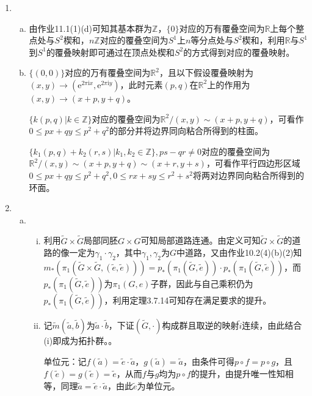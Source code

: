 \documentclass[a4paper,UTF8,fontset=windows]{ctexart}
\begin{document}
\begin{enumerate}[(1)]
    \item
    \begin{enumerate}[(a)]
    \item
    由作业11.1(1)(d)可知其基本群为$\mathbb{Z}$，$\{0\}$对应的万有覆叠空间为$\mathbb{R}$上每个整点处与$S^2$楔和，$n\mathbb{Z}$对应的覆叠空间为$S^1$上$n$等分点处与$S^2$楔和，利用$\mathbb{R}$与$S^1$到$S^1$的覆叠映射即可通过在顶点处楔和$S^2$的方式得到对应的覆叠映射。
    
    \item
    $\{(0,0)\}$对应的万有覆叠空间为$\mathbb{R}^2$，且以下假设覆叠映射为$(x,y)\to(\mathrm{e}^{2\pi\mathrm{i}x},\mathrm{e}^{2\pi\mathrm{i}y})$，此时元素$(p,q)$在$\mathbb{R}^2$上的作用为$(x,y)\to(x+p,y+q)$。
    
    $\{k(p,q)|k\in\mathbb{Z}\}$对应的覆叠空间为$\mathbb{R}^2/(x,y)\sim(x+p,y+q)$，可看作$0\le px+qy\le p^2+q^2$的部分并将边界同向粘合所得到的柱面。
    
    $\{k_1(p,q)+k_2(r,s)|k_1,k_2\in\mathbb{Z}\},ps-qr\ne0$对应的覆叠空间为$\mathbb{R}^2/(x,y)\sim(x+p,y+q)\sim(x+r,y+s)$，可看作平行四边形区域$0\le px+qy\le p^2+q^2,0\le rx+sy\le r^2+s^2$将两对边界同向粘合所得到的环面。
    \end{enumerate}
    
    \item
    \begin{enumerate}[(a)]
    \item
    \begin{enumerate}[(i)]
    \item
    利用$\tilde{G}\times\tilde{G}$局部同胚$G\times G$可知局部道路连通。由定义可知$\tilde{G}\times\tilde{G}$的道路的像一定为$\gamma_1\cdot\gamma_2$，其中$\gamma_1,\gamma_2$为$G$中道路，又由作业10.2(4)(b)(2)知$m_*(\pi_1(\tilde{G}\times\tilde{G},(\tilde{e},\tilde{e})))=p_*(\pi_1(\tilde{G},\tilde{e}))\cdot p_*(\pi_1(\tilde{G},\tilde{e}))$，而$p_*(\pi_1(\tilde{G},\tilde{e}))$为$\pi_1(G,e)$子群，因此与自己乘积仍为$p_*(\pi_1(\tilde{G},\tilde{e}))$，利用定理3.7.14可知存在满足要求的提升。
    
    \item
    记$\tilde{m}(\tilde{a},\tilde{b})$为$\tilde{a}\cdot\tilde{b}$，下证$(\tilde{G},\cdot)$构成群且取逆的映射$\tilde{i}$连续，由此结合(i)即成为拓扑群。。
    
    单位元：记$f(\tilde{a})=\tilde{e}\cdot\tilde{a}$，$g(\tilde{a})=\tilde{a}$，由条件可得$p\circ f=p\circ g$，且$f(\tilde{e})=g(\tilde{e})=\tilde{e}$，从而$f$与$g$均为$p\circ f$的提升，由提升唯一性知相等，同理$\tilde{a}=\tilde{e}\cdot\tilde{a}$，由此$\tilde{e}$为单位元。
    

\end{enumerate}
\end{enumerate}
\end{enumerate}
\end{document}
